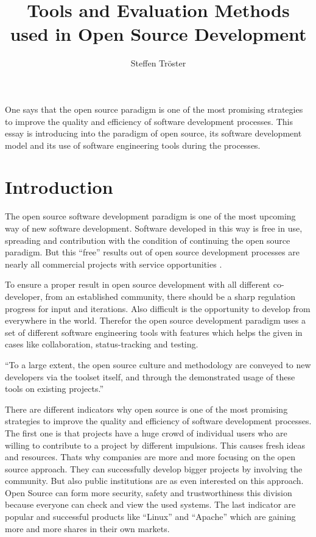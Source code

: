\documentclass[DIV=calc,paper=a4,fontsize=9pt,twocolumn]{scrartcl}
\title{Tools and Evaluation Methods used in Open Source Development}    %
\author{Steffen Tröster \\}											%
\date{}																%
\newcommand{\initial}[1]{%
     \lettrine[lines=2,lhang=0.3,nindent=0em]{
                    \color{headblue}
                    {\textsf{#1}}}{}}
\begin{document}
\maketitle
\thispagestyle{fancy}		%
\initial{O}ne says that the open source paradigm is one of the most promising strategies to improve the quality and efficiency of software development processes. This essay is introducing into the paradigm of open source, its software development model and its use of software engineering tools during the processes.


\section{Introduction}

The open source software development paradigm is one of the most upcoming way of new software development. Software developed in this way is free in use, spreading and contribution with the condition of continuing the open source paradigm. But this \enquote{free} results out of open source development processes are nearly all commercial projects with service opportunities \citep{Wheeler}.

To ensure a proper result in open source development with all different co-developer, from an established community, there should be a sharp regulation progress for input and iterations. Also difficult is the opportunity to develop from everywhere in the world. Therefor the open source development paradigm uses a set of different software engineering tools with features which helps the given in cases like collaboration, status-tracking and testing.

\enquote{To a large extent, the open source culture and methodology are conveyed to new developers via the toolset itself, and through the demonstrated usage of these tools on existing projects.} \citep{Robbins02adoptingoss}

There are different indicators why open source is one of the most promising strategies to improve the quality and efficiency of software development processes. The first one is that projects have a huge crowd of individual users who are willing to contribute to a project by different impulsions. This causes fresh ideas and resources. Thats why companies are more and more focusing on the open source approach. They can successfully develop bigger projects by involving the community. But also public institutions are as even interested on this approach. Open Source can form more security, safety and trustworthiness this division because everyone can check and view the used systems. The last indicator are popular and successful products like \enquote{Linux} and \enquote{Apache} which are gaining more and more shares in their own markets. \citep{fuggetta2003open}
\end{document}
